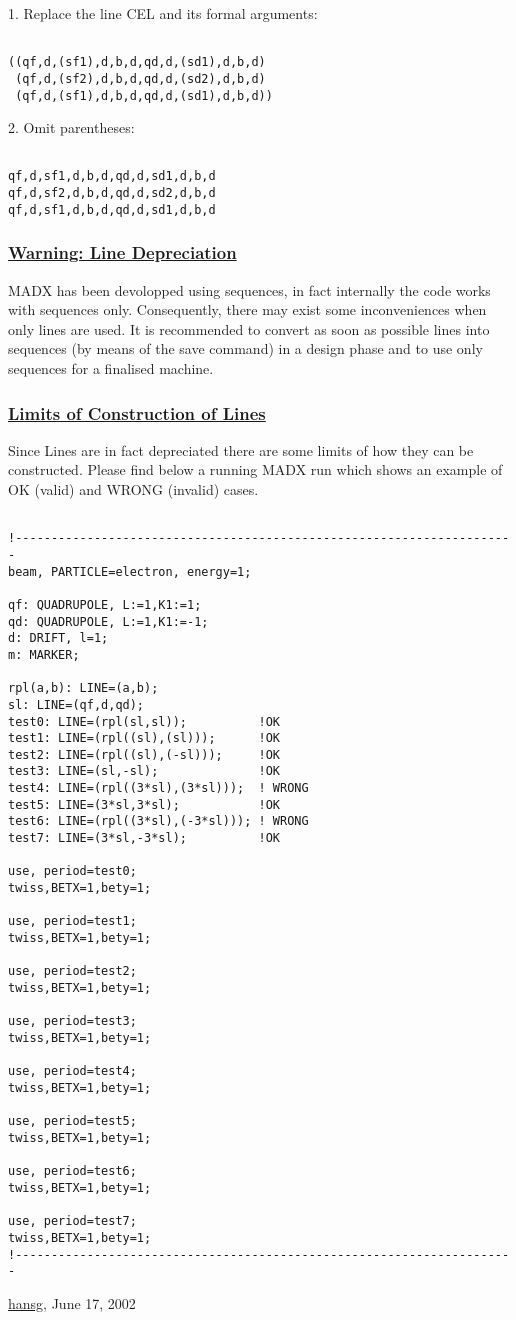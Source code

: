 1. Replace the line CEL and its formal arguments: 
\begin{verbatim}

((qf,d,(sf1),d,b,d,qd,d,(sd1),d,b,d)
 (qf,d,(sf2),d,b,d,qd,d,(sd2),d,b,d)
 (qf,d,(sf1),d,b,d,qd,d,(sd1),d,b,d))
\end{verbatim}

 2. Omit parentheses: 
\begin{verbatim}

qf,d,sf1,d,b,d,qd,d,sd1,d,b,d
qf,d,sf2,d,b,d,qd,d,sd2,d,b,d
qf,d,sf1,d,b,d,qd,d,sd1,d,b,d
\end{verbatim}

\subsubsection{\href{Line_Depreciation}{Warning: Line Depreciation}} MADX has been devolopped using sequences, in fact internally the code works with sequences only. Consequently, there may exist some inconveniences when only lines are used. It is recommended to convert as soon as possible lines into sequences (by means of the save command) in a design phase and to use only sequences for a finalised machine.   

\subsubsection{\href{Line_Limits}{ Limits of Construction of Lines}}  Since Lines are in fact depreciated there are some limits of how they can be constructed. Please find below a running MADX run which shows an example of OK (valid) and WRONG (invalid) cases.  
\begin{verbatim}

!----------------------------------------------------------------------
beam, PARTICLE=electron, energy=1;

qf: QUADRUPOLE, L:=1,K1:=1;
qd: QUADRUPOLE, L:=1,K1:=-1;
d: DRIFT, l=1;
m: MARKER;

rpl(a,b): LINE=(a,b);
sl: LINE=(qf,d,qd);
test0: LINE=(rpl(sl,sl));          !OK 
test1: LINE=(rpl((sl),(sl)));      !OK
test2: LINE=(rpl((sl),(-sl)));     !OK
test3: LINE=(sl,-sl);              !OK
test4: LINE=(rpl((3*sl),(3*sl)));  ! WRONG
test5: LINE=(3*sl,3*sl);           !OK
test6: LINE=(rpl((3*sl),(-3*sl))); ! WRONG
test7: LINE=(3*sl,-3*sl);          !OK

use, period=test0;
twiss,BETX=1,bety=1;

use, period=test1;
twiss,BETX=1,bety=1;

use, period=test2;
twiss,BETX=1,bety=1;

use, period=test3;
twiss,BETX=1,bety=1;

use, period=test4;
twiss,BETX=1,bety=1;

use, period=test5;
twiss,BETX=1,bety=1;

use, period=test6;
twiss,BETX=1,bety=1;

use, period=test7;
twiss,BETX=1,bety=1;
!----------------------------------------------------------------------
\end{verbatim}\href{http://www.cern.ch/Hans.Grote/hansg_sign.html}{hansg}, June 17, 2002 


